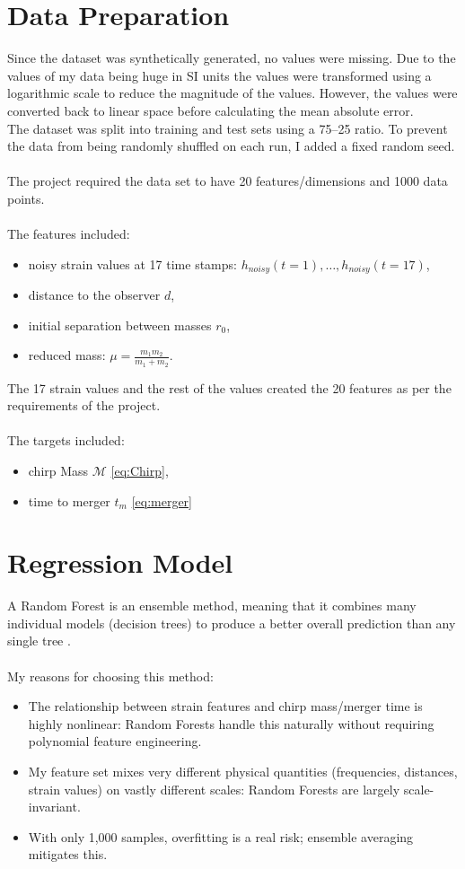 \documentclass[12pt]{article}
\begin{document}
\section{Data Preparation}
\label{dataprep}
Since the dataset was synthetically generated, no values were missing. Due to the values of my data being huge in SI units the values were transformed using a logarithmic scale to reduce the magnitude of the values. However, the values were converted back to linear space before calculating the mean absolute error. \\
The dataset was split into training and test sets using a 75–25 ratio. To prevent the data from being randomly shuffled on each run, I added a fixed random seed.\\
\\The project required the data set to have 20 features/dimensions and 1000 data points.\\
\\The features included: 
\begin{itemize}
    \item noisy strain values at 17 time stamps: $h_{noisy}(t=1),\dots,h_{noisy}(t=17)$,
    \item distance to the observer $d$, 
    \item initial separation between masses $r_0$,
    \item reduced mass: $\mu = \frac{m_1m_2}{m_1+m_2}$.
\end{itemize}
The 17 strain values and the rest of the values created the 20 features as per the requirements of the project.
\\
\\The targets included:
\begin{itemize}
    \item chirp Mass $\mathcal{M}$ \eqref{eq:Chirp}, 
    \item time to merger $t_m$ \eqref{eq:merger}\\
\end{itemize}

\section{Regression Model}
\label{model}
A Random Forest is an ensemble method, meaning that it combines many individual models (decision trees) to produce a better overall prediction than any single tree \cite{IBMRandomForest}.\\
\\My reasons for choosing this method:
\begin{itemize}
    \item The relationship between strain features and chirp mass/merger time is highly nonlinear: Random Forests handle this naturally without requiring polynomial feature engineering.
    \item My feature set mixes very different physical quantities (frequencies, distances, strain values) on vastly different scales: Random Forests are largely scale-invariant.
    \item With only 1,000 samples, overfitting is a real risk; ensemble averaging mitigates this.
\end{itemize}
\end{document}
